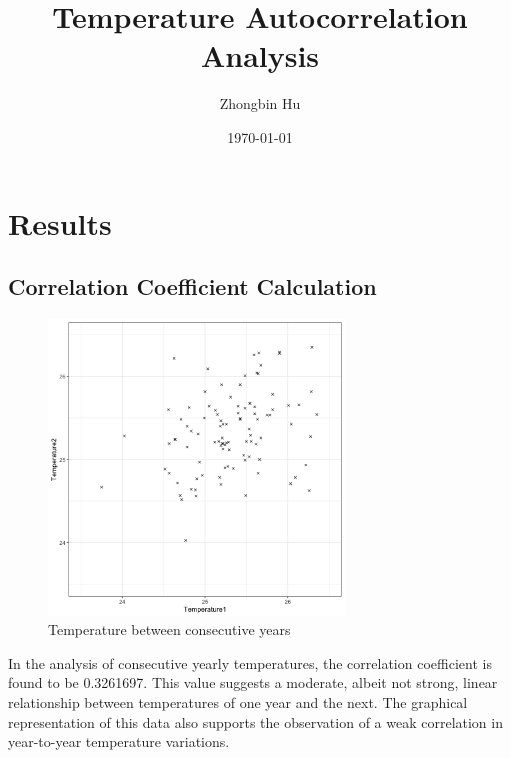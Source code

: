 \documentclass[a4paper,12pt]{article}
\title{Temperature Autocorrelation Analysis}
\author{Zhongbin Hu}
\date{\today}
\begin{document}
\maketitle
\section{Results}

\subsection{Correlation Coefficient Calculation}
  \begin{figure}[ht]
    \centering
    \includegraphics[width=0.7\textwidth]{../data/ats_plot.png}
    \caption{Temperature between consecutive years}
  \end{figure}
  In the analysis of consecutive yearly temperatures, the correlation coefficient is found to be 0.3261697. This value suggests a moderate, albeit not strong, linear relationship between temperatures of one year and the next. The graphical representation of this data also supports the observation of a weak correlation in year-to-year temperature variations.
\end{document}
